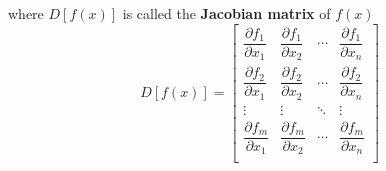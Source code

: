 \documentclass[../linear-spaces.tex]{subfiles}
\begin{document}
where $D[f(x)]$ is called the \textbf{Jacobian matrix} of $f(x)$
\begin{equation}
    D[f(x)] = \begin{bmatrix}
        \dfrac{\partial f_1}{\partial x_1} & \dfrac{\partial f_1}{\partial x_2} & \cdots & \dfrac{\partial f_1}{\partial x_n} \\[1em]
        \dfrac{\partial f_2}{\partial x_1} & \dfrac{\partial f_2}{\partial x_2} & \cdots & \dfrac{\partial f_2}{\partial x_n} \\[1em]
        \vdots                             & \vdots                             & \ddots & \vdots                             \\[1em]
        \dfrac{\partial f_m}{\partial x_1} & \dfrac{\partial f_m}{\partial x_2} & \cdots & \dfrac{\partial f_m}{\partial x_n} \\[1em]
    \end{bmatrix}
\end{equation}
\end{document}
